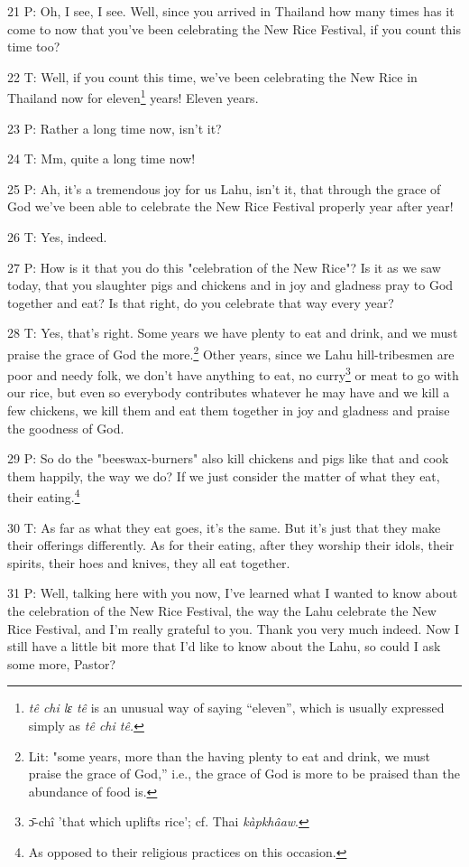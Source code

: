 21 P: Oh, I see, I see. Well, since you arrived in Thailand how many times has
it come to now that you've been celebrating the New Rice Festival, if you count
this time too?

22 T: Well, if you count this time, we've been celebrating the New Rice in Thailand
now for eleven\footnote{\textit{tê chi lɛ tê} is an unusual way of saying ``eleven'', which is usually expressed simply as \textit{tê chi tê.}} years! Eleven years.

23 P: Rather a long time now, isn't it?

24 T: Mm, quite a long time now!

25 P: Ah, it's a tremendous joy for us Lahu, isn't it, that through the grace of
God we've been able to celebrate the New Rice Festival properly year after year!

26 T: Yes, indeed.

27 P: How is it that you do this "celebration of the New Rice"?
Is it as we saw today, that you slaughter pigs and chickens and in joy and gladness
pray to God together and eat? Is that right, do you celebrate that way every year?

28 T: Yes, that's right. Some years we have plenty to eat and drink, and we must
praise the grace of God the more.\footnote{Lit: "some years, more than the having plenty to eat and drink, we must praise the grace of God,'' i.e., the grace of God is more to be praised than the abundance of food is.} Other years, since we Lahu hill-tribesmen
are poor and needy folk, we don't have anything to eat, no curry\footnote{ɔ̄-chî 'that which uplifts rice'; cf. Thai \textit{kàpkhâaw}.} or meat to
go with our rice, but even so everybody contributes whatever he may have and we
kill a few chickens, we kill them and eat them together in joy and gladness and
praise the goodness of God.

29 P: So do the "beeswax-burners" also kill chickens and pigs
like that and cook them happily, the way we do? If we just consider the matter
of what they eat, their eating.\footnote{As opposed to their religious practices on this occasion.}

30 T: As far as what they eat goes, it's the same. But it's just that they make
their offerings differently. As for their eating, after they worship their idols,
their spirits, their hoes and knives, they all eat together.

31 P: Well, talking here with you now, I've learned what I wanted to know about
the celebration of the New Rice Festival, the way the Lahu celebrate the New Rice
Festival, and I'm really grateful to you. Thank you very much indeed. Now I still
have a little bit more that I'd like to know about the Lahu, so could I ask some
more, Pastor?

